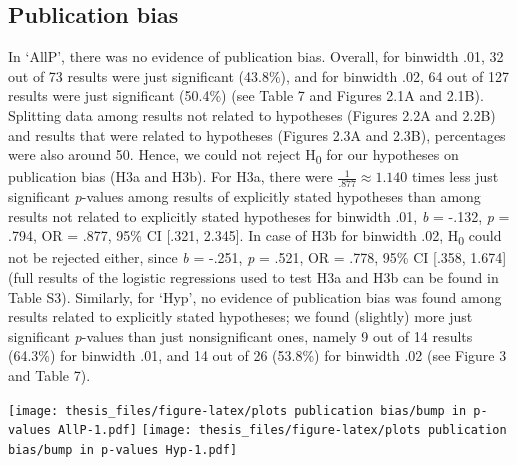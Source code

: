 \documentclass[
  12pt,
]{article}
\begin{document}
\hypertarget{publication-bias}{%
\subsection{Publication bias}\label{publication-bias}}

In `AllP', there was no evidence of publication bias. Overall, for
binwidth .01, 32 out of 73 results were just significant (43.8\%), and
for binwidth .02, 64 out of 127 results were just significant (50.4\%)
(see Table 7 and Figures 2.1A and 2.1B). Splitting data among results
not related to hypotheses (Figures 2.2A and 2.2B) and results that were
related to hypotheses (Figures 2.3A and 2.3B), percentages were also
around 50. Hence, we could not reject H\textsubscript{0} for our
hypotheses on publication bias (H3a and H3b). For H3a, there were
\(\frac{1}{.877} \approx 1.140\) times less just significant
\emph{p}-values among results of explicitly stated hypotheses than among
results not related to explicitly stated hypotheses for binwidth .01,
\emph{b} = -.132, \emph{p} = .794, OR = .877, 95\% CI {[}.321, 2.345{]}.
In case of H3b for binwidth .02, H\textsubscript{0} could not be
rejected either, since \emph{b} = -.251, \emph{p} = .521, OR = .778,
95\% CI {[}.358, 1.674{]} (full results of the logistic regressions used
to test H3a and H3b can be found in Table S3). Similarly, for `Hyp', no
evidence of publication bias was found among results related to
explicitly stated hypotheses; we found (slightly) more just significant
\emph{p}-values than just nonsignificant ones, namely 9 out of 14
results (64.3\%) for binwidth .01, and 14 out of 26 (53.8\%) for
binwidth .02 (see Figure 3 and Table 7).

\texttt{[image: thesis\_files/figure-latex/plots publication bias/bump in p-values AllP-1.pdf]}
\texttt{[image: thesis\_files/figure-latex/plots publication bias/bump in p-values Hyp-1.pdf]}

\pagebreak

\begingroup\fontsize{10}{12}\selectfont
\end{document}
